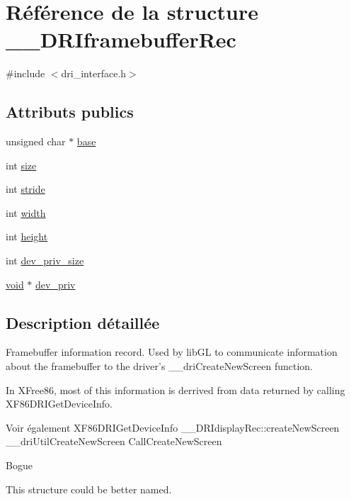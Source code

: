 \hypertarget{struct_____d_r_iframebuffer_rec}{\section{Référence de la structure \-\_\-\-\_\-\-D\-R\-Iframebuffer\-Rec}
\label{struct_____d_r_iframebuffer_rec}
}


{\ttfamily \#include $<$dri\-\_\-interface.\-h$>$}

\subsection*{Attributs publics}
\begin{DoxyCompactItemize}
\item 
unsigned char $\ast$ \hyperlink{struct_____d_r_iframebuffer_rec_ad4b7d037cf68bf62da49568e6826a2d6}{base}
\item 
int \hyperlink{struct_____d_r_iframebuffer_rec_aa3a4d320b15693103d593499abce5b08}{size}
\item 
int \hyperlink{struct_____d_r_iframebuffer_rec_a2889cbb92d1327c5bebb4cacbe9f6774}{stride}
\item 
int \hyperlink{struct_____d_r_iframebuffer_rec_a9b92fd71279bc61c4d58d88a8b06425b}{width}
\item 
int \hyperlink{struct_____d_r_iframebuffer_rec_aae5cb6f3fb0d56e7a8989bcb2a2d3761}{height}
\item 
int \hyperlink{struct_____d_r_iframebuffer_rec_a0bfbde5e050baa8aa3450a60ce51a85d}{dev\-\_\-priv\-\_\-size}
\item 
\hyperlink{glu_8h_a4292190e3f1f6b373a760c7d9316ad3c}{void} $\ast$ \hyperlink{struct_____d_r_iframebuffer_rec_af315b382c3a95a2acbddd5ed8157bfad}{dev\-\_\-priv}
\end{DoxyCompactItemize}


\subsection{Description détaillée}
Framebuffer information record. Used by lib\-G\-L to communicate information about the framebuffer to the driver's {\ttfamily \-\_\-\-\_\-dri\-Create\-New\-Screen} function.

In X\-Free86, most of this information is derrived from data returned by calling {\ttfamily X\-F86\-D\-R\-I\-Get\-Device\-Info}.

\begin{DoxySeeAlso}{Voir également}
X\-F86\-D\-R\-I\-Get\-Device\-Info \-\_\-\-\_\-\-D\-R\-Idisplay\-Rec\-::create\-New\-Screen \-\_\-\-\_\-dri\-Util\-Create\-New\-Screen Call\-Create\-New\-Screen
\end{DoxySeeAlso}
\begin{DoxyRefDesc}{Bogue}
\item[\hyperlink{bug__bug000001}{Bogue}]This structure could be better named. \end{DoxyRefDesc}


